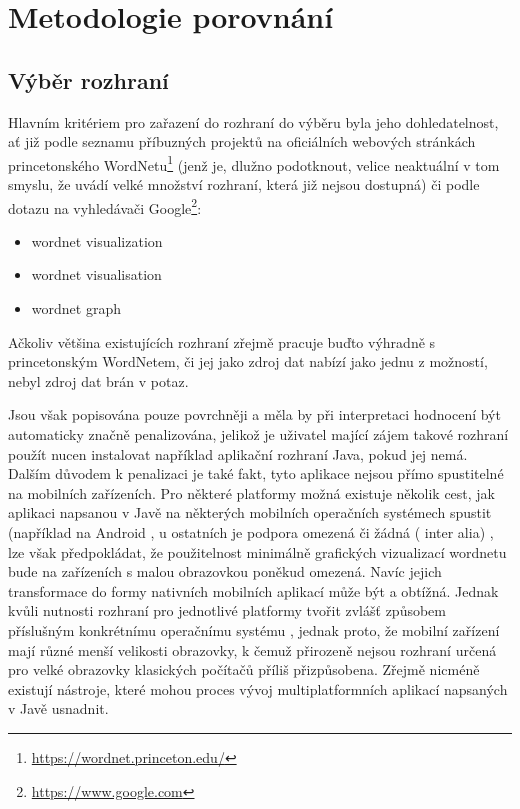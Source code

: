 \documentclass[a4paper, 11pt, oneside]{book}
\begin{document}
		\chapter{Metodologie porovnání}

			\section{Výběr rozhraní}

				Hlavním kritériem pro zařazení do rozhraní do výběru byla jeho dohledatelnost, ať již podle seznamu příbuzných projektů na oficiálních webových stránkách princetonského WordNetu\footnote{\url{https://wordnet.princeton.edu/}} (jenž je, dlužno podotknout, velice neaktuální v tom smyslu, že uvádí velké množství rozhraní, která již nejsou dostupná) či podle dotazu na vyhledávači Google\footnote{\url{https://www.google.com}}:

					\begin{itemize}
						\item wordnet visualization
						\item wordnet visualisation
						\item wordnet graph
					\end{itemize}

					 Ačkoliv většina existujících rozhraní zřejmě pracuje buďto výhradně s princetonským WordNetem, či jej jako zdroj dat nabízí jako jednu z možností, nebyl zdroj dat brán v potaz.

				 Jsou však popisována pouze povrchněji a měla by při interpretaci hodnocení být automaticky značně penalizována, jelikož je uživatel mající zájem takové rozhraní použít nucen instalovat například aplikační rozhraní Java, pokud jej nemá. Dalším důvodem k penalizaci je také fakt, tyto aplikace nejsou přímo spustitelné na mobilních zařízeních. Pro některé platformy možná existuje několik cest, jak aplikaci napsanou v Javě na některých mobilních operačních systémech spustit (například na Android \parencite{SX92854}, u ostatních je podpora omezená či žádná (\parencite{SX15501535,SX1193541} inter alia)%
				, lze však předpokládat, že použitelnost minimálně grafických vizualizací wordnetu bude na zařízeních s malou obrazovkou poněkud omezená.  Navíc jejich transformace do formy nativních mobilních aplikací může být a obtížná. Jednak kvůli nutnosti rozhraní pro jednotlivé platformy tvořit zvlášť způsobem příslušným konkrétnímu operačnímu systému \parencite{gronli2014mobile}, jednak proto, že mobilní zařízení mají různé menší velikosti obrazovky, k čemuž přirozeně nejsou rozhraní určená pro velké obrazovky klasických počítačů příliš přizpůsobena. Zřejmě nicméně existují nástroje, které mohou proces vývoj multiplatformních aplikací napsaných v Javě usnadnit. \parencite{mafintro}
\end{document}
